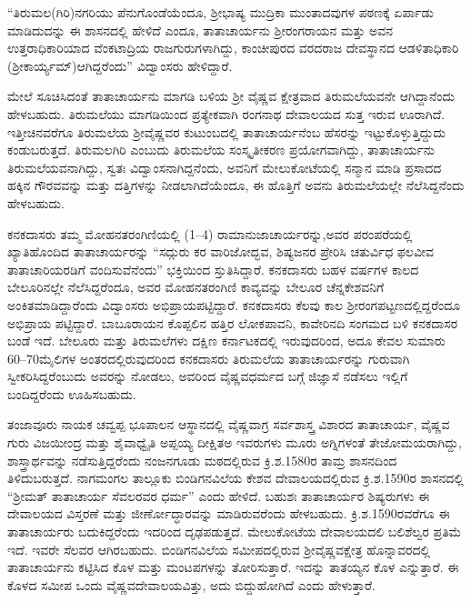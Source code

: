 “ತಿರುಮಲ(ಗಿರಿ)ನಗರಿಯು ಪೆನುಗೊಂಡೆಯೆಂದೂ, ಶ‍್ರೀಭಾಷ್ಯ ಮುದ್ರಿಕಾ ಮುಂತಾದವುಗಳ ಪಠಣಕ್ಕೆ ಏರ್ಪಾಡು ಮಾಡಿದುದನ್ನು ಈ ಶಾಸನದಲ್ಲಿ ಹೇಳಿದೆ ಎಂದೂ, ತಾತಾಚಾರ್ಯನು ಶ‍್ರೀರಂಗರಾಯನ ಮತ್ತು ಅವನ ಉತ್ತರಾಧಿಕಾರಿಯಾದ ವೆಂಕಟಾದ್ರಿಯ ರಾಜಗುರುಗಳಾಗಿದ್ದು, ಕಾಂಚೀಪುರದ ವರದರಾಜ ದೇವಸ್ಥಾನದ ಆಡಳಿತಾಧಿಕಾರಿ (ಶ‍್ರೀಕಾರ್ಯ್ಯಮ್)ಆಗಿದ್ದರೆಂದು” ವಿದ್ವಾಂಸರು ಹೇಳಿದ್ದಾರೆ.

ಮೇಲೆ ಸೂಚಿಸಿದಂತೆ ತಾತಾಚಾರ್ಯನು ಮಾಗಡಿ ಬಳಿಯ ಶ‍್ರೀ ವೈಷ್ಣವ ಕ್ಷೇತ್ರವಾದ ತಿರುಮಲೆಯವನೇ ಆಗಿದ್ದಾನೆಂದು ಹೇಳಬಹುದು. ತಿರುಮಲೆಯು ಮಾಗಡಿಯಿಂದ ಪ್ರತ್ಯೇಕವಾಗಿ ರಂಗನಾಥ ದೇವಾಲಯದ ಸುತ್ತ ಇರುವ ಊರಾಗಿದೆ. ಇತ್ತೀಚಿನವರೆಗೂ ತಿರುಮಲೆಯ ಶ‍್ರೀವೈಷ್ಣವರ ಕುಟುಂಬದಲ್ಲಿ ತಾತಾಚಾರ್ಯನೆಂಬ ಹೆಸರನ್ನು ಇಟ್ಟುಕೊಳ್ಳುತ್ತಿದ್ದುದು ಕಂಡುಬರುತ್ತದೆ. ತಿರುಮಲಗಿರಿ ಎಂಬುದು ತಿರುಮಲೆಯ ಸಂಸ್ಕೃತೀಕರಣ ಪ್ರಯೋಗವಾಗಿದ್ದು, ತಾತಾಚಾರ್ಯನು ತಿರುಮಲೆಯವನಾಗಿದ್ದು, ಸ್ವತಃ ವಿದ್ವಾಂಸನಾಗಿದ್ದನೆಂದು, ಅವನಿಗೆ ಮೇಲುಕೋಟೆಯಲ್ಲಿ ಸನ್ಮಾನ ಮಾಡಿ ಪ್ರಸಾದದ ಹಕ್ಕಿನ ಗೌರವವನ್ನು ಮತ್ತು ದತ್ತಿಗಳನ್ನು ನೀಡಲಾಗಿದೆಯೆಂದೂ, ಈ ಹೊತ್ತಿಗೆ ಅವನು ತಿರುಮಲೆಯಲ್ಲೇ ನೆಲೆಸಿದ್ದನೆಂದು ಹೇಳಬಹುದು.

ಕನಕದಾಸರು ತಮ್ಮ ಮೋಹನತರಂಗಿಣಿಯಲ್ಲಿ (1–4) ರಾಮಾನುಜಾಚಾರ್ಯರನ್ನು,ಅವರ ಪರಂಪರೆಯಲ್ಲಿ ಖ್ಯಾತಿಹೊಂದಿದ ತಾತಾಚಾರ್ಯರನ್ನು “ಸದ್ಗುರು ಕರ ವಾರಿಜೋದ್ಭವ, ಶಿಷ್ಯಜನರ ಪ್ರೇರಿಸಿ ಚತುರ್ವಿಧ ಫಲವೀವ ತಾತಾಚಾರಿಯರಡಿಗೆ ವಂದಿಸುವೆನೆಂದು” ಭಕ್ತಿಯಿಂದ ಸ್ತುತಿಸಿದ್ದಾರೆ. ಕನಕದಾಸರು ಬಹಳ ವರ್ಷಗಳ ಕಾಲದ ಬೇಲೂರಿನಲ್ಲೇ ನೆಲೆಸಿದ್ದರೆಂದೂ, ಅವರ ಮೋಹನತರಂಗಿಣಿ ಕಾವ್ಯವನ್ನು ಬೇಲೂರ ಚೆನ್ನಕೇಶವನಿಗೆ ಅಂಕಿತಮಾಡಿದ್ದಾರೆಂದು ವಿದ್ವಾಂಸರು ಅಭಿಪ್ರಾಯಪಟ್ಟಿದ್ದಾರೆ. ಕನಕದಾಸರು ಕೆಲವು ಕಾಲ ಶ‍್ರೀರಂಗಪಟ್ಟಣದಲ್ಲಿದ್ದರೆಂದೂ ಅಭಿಪ್ರಾಯ ಪಟ್ಟಿದ್ದಾರೆ. ಬಾಬೂರಾಯನ ಕೊಪ್ಪಲಿನ ಹತ್ತಿರ ಲೋಕಪಾವನಿ, ಕಾವೇರಿನದಿ ಸಂಗಮದ ಬಳಿ ಕನಕದಾಸರ ಬಂಡೆ ಇದೆ. ಬೇಲೂರು ಮತ್ತು ತಿರುಮಲೆಗಳು ದಕ್ಷಿಣ ಕರ್ನಾಟಕದಲ್ಲಿ ಇರುವುದರಿಂದ, ಅದೂ ಕೇವಲ ಸುಮಾರು 60–70ಮೈಲಿಗಳ ಅಂತರದಲ್ಲಿರುವುದರಿಂದ ಕನಕದಾಸರು ತಿರುಮಲೆಯ ತಾತಾಚಾರ್ಯರನ್ನು ಗುರುವಾಗಿ ಸ್ವೀಕರಿಸಿದ್ದರೆಂಬುದು ಅವರನ್ನು ನೋಡಲು, ಅವರಿಂದ ವೈಷ್ಣವಧರ್ಮದ ಬಗ್ಗೆ ಜಿಜ್ಞಾಸೆ ನಡೆಸಲು ಇಲ್ಲಿಗೆ ಬಂದಿದ್ದರೆಂದು ಊಹಿಸಬಹುದು.

ತಂಜಾವೂರು ನಾಯಕ ಚವ್ವಪ್ಪ ಭೂಪಾಲನ ಆಸ್ಥಾನದಲ್ಲಿ ವೈಷ್ಣವಾಗ್ರ ಸರ್ವಶಾಸ್ತ್ರ ವಿಶಾರದ ತಾತಾಚಾರ್ಯ, ವೈಷ್ಣವ ಗುರು ವಿಜಯೀಂದ್ರ ಮತ್ತು ಶೈವಾಧ್ವೈತಿ ಅಪ್ಪಯ್ಯ ದೀಕ್ಷಿತಅ ಇವರುಗಳು ಮೂರು ಅಗ್ನಿಗಳಂತೆ ತೇಜೋಮಯರಾಗಿದ್ದು, ಶಾಸ್ತ್ರಾರ್ಥವನ್ನು ನಡೆಸುತ್ತಿದ್ದರೆಂದು ನಂಜನಗೂಡು ಮಠದಲ್ಲಿರುವ ಕ್ರಿ.ಶ.1580ರ ತಾಮ್ರ ಶಾಸನದಿಂದ ತಿಳಿದುಬರುತ್ತದೆ. ನಾಗಮಂಗಲ ತಾಲ್ಲೂಕು ಬಿಂಡಿಗನವಿಲೆಯ ಕೇಶವ ದೇವಾಲಯದಲ್ಲಿರುವ ಕ್ರಿ.ಶ.1590ರ ಶಾಸನದಲ್ಲಿ “ಶ‍್ರೀಮತ್​ ತಾತಾಚಾರ್ಯ ಸೆವಲರವರ ಧರ್ಮ” ಎಂದು ಹೇಳಿದೆ. ಬಹುಶಃ ತಾತಾಚಾರ್ಯರ ಶಿಷ್ಯರುಗಳು ಈ ದೇವಾಲಯದ ವಿಸ್ತರಣೆ ಮತ್ತು ಜೀರ್ಣೋದ್ಧಾರವನ್ನು ಮಾಡಿರುವರೆಂದು ಹೇಳಬಹುದು. ಕ್ರಿ.ಶ.1590ರವರೆಗೂ ಈ ತಾತಾಚಾರ್ಯರು ಬದುಕಿದ್ದರೆಂದು ಇದರಿಂದ ದೃಢಪಡುತ್ತದೆ. ಮೇಲುಕೋಟೆಯ ದೇವಾಲಯದಲಿ ಬಲಿಶೆಲ್ವರ ಪ್ರತಿಮೆ ಇದೆ. ಇವರೇ ಸೆಲವರ ಆಗಿರಬಹುದು. ಬಿಂಡಿಗನವಿಲೆಯ ಸಮೀಪದಲ್ಲಿರುವ ಶ‍್ರೀವೈಷ್ಣವಕ್ಷೇತ್ರ ಹೊನ್ನಾವರದಲ್ಲಿ ತಾತಾಚಾರ್ಯನು ಕಟ್ಟಿಸಿದ ಕೊಳ ಮತ್ತು ಮಂಟಪಗಳನ್ನು ತೋರಿಸುತ್ತಾರೆ. ಇದನ್ನು ತಾತಯ್ಯನ ಕೊಳ ಎನ್ನುತ್ತಾರೆ. ಈ ಕೊಳದ ಸಮೀಪ ಒಂದು ವೈಷ್ಣವದೇವಾಲಯವಿತ್ತು, ಅದು ಬಿದ್ದುಹೋಗಿದೆ ಎಂದು ಹೇಳುತ್ತಾರೆ.

